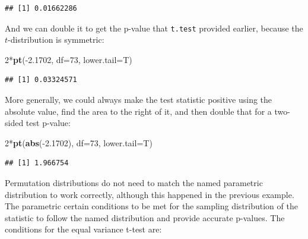 \documentclass[]{book}
\newenvironment{Shaded}{\begin{snugshade}}{\end{snugshade}}
\newcommand{\KeywordTok}[1]{\textcolor[rgb]{0.13,0.29,0.53}{\textbf{{#1}}}}
\newcommand{\DataTypeTok}[1]{\textcolor[rgb]{0.13,0.29,0.53}{{#1}}}
\newcommand{\DecValTok}[1]{\textcolor[rgb]{0.00,0.00,0.81}{{#1}}}
\newcommand{\FloatTok}[1]{\textcolor[rgb]{0.00,0.00,0.81}{{#1}}}
\newcommand{\NormalTok}[1]{{#1}}
\begin{document}
\begin{verbatim}
## [1] 0.01662286
\end{verbatim}

And we can double it to get the p-value that \texttt{t.test} provided
earlier, because the \(t\)-distribution is symmetric:

\begin{Shaded}
\begin{Highlighting}[]
\DecValTok{2}\NormalTok{*}\KeywordTok{pt}\NormalTok{(-}\FloatTok{2.1702}\NormalTok{, }\DataTypeTok{df=}\DecValTok{73}\NormalTok{, }\DataTypeTok{lower.tail=}\NormalTok{T)}
\end{Highlighting}
\end{Shaded}

\begin{verbatim}
## [1] 0.03324571
\end{verbatim}

More generally, we could always make the test statistic positive using
the absolute value, find the area to the right of it, and then double
that for a two-sided test p-value:

\begin{Shaded}
\begin{Highlighting}[]
\DecValTok{2}\NormalTok{*}\KeywordTok{pt}\NormalTok{(}\KeywordTok{abs}\NormalTok{(-}\FloatTok{2.1702}\NormalTok{), }\DataTypeTok{df=}\DecValTok{73}\NormalTok{, }\DataTypeTok{lower.tail=}\NormalTok{T)}
\end{Highlighting}
\end{Shaded}

\begin{verbatim}
## [1] 1.966754
\end{verbatim}

Permutation distributions do not need to match the named parametric
distribution to work correctly, although this happened in the previous
example. The parametric certain conditions to be met for the sampling
distribution of the statistic to follow the named distribution and
provide accurate p-values. The conditions for the equal variance t-test
are:
\end{document}
